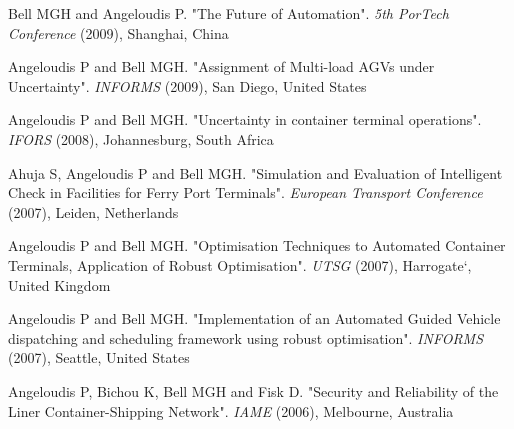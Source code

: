 \documentclass[margin]{res}
\begin{document}
\begin{resume}
\begin{etaremune}
	\item
	{Bell MGH and Angeloudis P}. "{The Future of Automation}". \textit{5th PorTech Conference} (2009), Shanghai, China
	\item
	{Angeloudis P and Bell MGH}. "{Assignment of Multi-load AGVs under Uncertainty}". \textit{INFORMS} (2009), San Diego, United States
	\item
	{Angeloudis P and Bell MGH}. "{Uncertainty in container terminal operations}". \textit{IFORS} (2008), Johannesburg, South Africa
	\item
	{Ahuja S, Angeloudis P and Bell MGH}. "{Simulation and Evaluation of Intelligent Check in Facilities for Ferry Port Terminals}". \textit{European Transport Conference} (2007), Leiden, Netherlands
	\item
	{Angeloudis P and Bell MGH}. "{Optimisation Techniques to Automated Container Terminals, Application of Robust Optimisation}". \textit{UTSG} (2007), Harrogate{}`, United Kingdom
	\item
	{Angeloudis P and Bell MGH}. "{Implementation of an Automated Guided Vehicle dispatching and scheduling framework using robust optimisation}". \textit{INFORMS} (2007), Seattle, United States
	\item
	{Angeloudis P, Bichou K, Bell MGH and Fisk D}. "{Security and Reliability of the Liner Container-Shipping Network}". \textit{IAME} (2006), Melbourne, Australia
\end{etaremune}


\end{resume}
\end{document}
